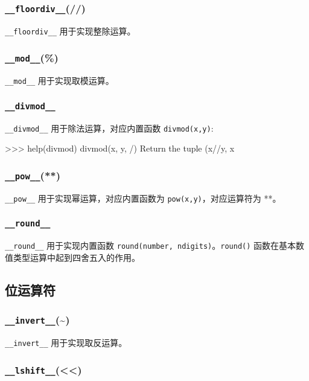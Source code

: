 \subsubsection{\texttt{\_\_floordiv\_\_}(//)}

\texttt{\_\_floordiv\_\_} 用于实现整除运算。

\subsubsection{\texttt{\_\_mod\_\_}(\%)}

\texttt{\_\_mod\_\_} 用于实现取模运算。

\subsubsection{\texttt{\_\_divmod\_\_}}

\texttt{\_\_divmod\_\_} 用于除法运算，对应内置函数 \texttt{divmod(x,y)}:
\begin{python}
>>> help(divmod)
divmod(x, y, /)
    Return the tuple (x//y, x%
\end{python}

\subsubsection{\texttt{\_\_pow\_\_}(**)}

\texttt{\_\_pow\_\_} 用于实现幂运算，对应内置函数为 \texttt{pow(x,y)}，对应运算符为 **。

\subsubsection{\texttt{\_\_round\_\_}}

\texttt{\_\_round\_\_} 用于实现内置函数 \texttt{round(number, ndigits)}。\texttt{round()} 函数在基本数值类型运算中起到四舍五入的作用。

\subsection{位运算符}

\subsubsection{\texttt{\_\_invert\_\_}(\textasciitilde)}

\texttt{\_\_invert\_\_} 用于实现取反运算。

\subsubsection{\texttt{\_\_lshift\_\_}(<<)}


